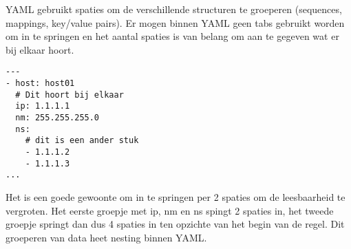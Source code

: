 YAML gebruikt spaties om de verschillende structuren te groeperen (sequences, mappings, key/value pairs). Er mogen binnen YAML geen tabs gebruikt worden om in te springen en het aantal spaties is van belang om aan te gegeven wat er bij elkaar hoort.
\begin{verbatim}
---
- host: host01
  # Dit hoort bij elkaar
  ip: 1.1.1.1
  nm: 255.255.255.0
  ns:
    # dit is een ander stuk
    - 1.1.1.2
    - 1.1.1.3
...
\end{verbatim}

Het is een goede gewoonte om in te springen per 2 spaties om de leesbaarheid te vergroten. Het eerste groepje met ip, nm en ns spingt 2 spaties in, het tweede groepje springt dan dus 4 spaties in ten opzichte van het begin van de regel. Dit groeperen van data heet nesting binnen YAML.

